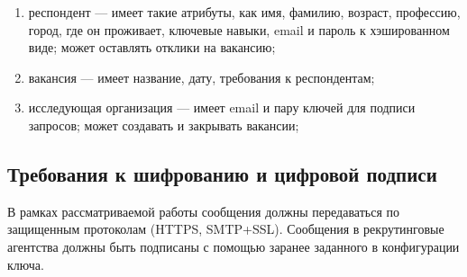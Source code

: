 \begin{enumerate}
\item респондент — имеет такие атрибуты, как имя, фамилию, возраст, профессию, город, где он проживает, ключевые навыки, email и пароль к хэшированном виде; может оставлять отклики на вакансию;
\item вакансия — имеет название, дату, требования к респондентам;
\item исследующая организация — имеет email и пару ключей для подписи запросов; может создавать и закрывать вакансии;
\end{enumerate}

\subsection{Требования к шифрованию и цифровой подписи}
В рамках рассматриваемой работы сообщения должны передаваться по защищенным протоколам (HTTPS, SMTP+SSL). Сообщения в рекрутинговые агентства должны быть подписаны с помощью заранее заданного в конфигурации ключа.

